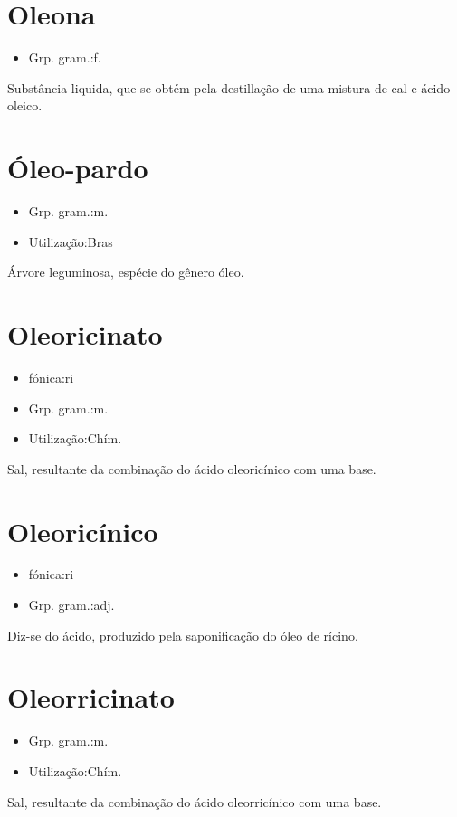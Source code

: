 \section{Oleona}
\begin{itemize}
\item {Grp. gram.:f.}
\end{itemize}
Substância liquida, que se obtém pela destillação de uma mistura de cal e ácido oleico.
\section{Óleo-pardo}
\begin{itemize}
\item {Grp. gram.:m.}
\end{itemize}
\begin{itemize}
\item {Utilização:Bras}
\end{itemize}
Árvore leguminosa, espécie do gênero \textunderscore óleo\textunderscore .
\section{Oleoricinato}
\begin{itemize}
\item {fónica:ri}
\end{itemize}
\begin{itemize}
\item {Grp. gram.:m.}
\end{itemize}
\begin{itemize}
\item {Utilização:Chím.}
\end{itemize}
Sal, resultante da combinação do ácido oleoricínico com uma base.
\section{Oleoricínico}
\begin{itemize}
\item {fónica:ri}
\end{itemize}
\begin{itemize}
\item {Grp. gram.:adj.}
\end{itemize}
Diz-se do ácido, produzido pela saponificação do óleo de rícino.
\section{Oleorricinato}
\begin{itemize}
\item {Grp. gram.:m.}
\end{itemize}
\begin{itemize}
\item {Utilização:Chím.}
\end{itemize}
Sal, resultante da combinação do ácido oleorricínico com uma base.
